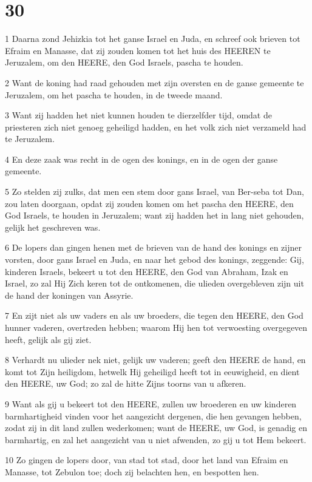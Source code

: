 \chapter{30}

\par 1 Daarna zond Jehizkia tot het ganse Israel en Juda, en schreef ook brieven tot Efraim en Manasse, dat zij zouden komen tot het huis des HEEREN te Jeruzalem, om den HEERE, den God Israels, pascha te houden.
\par 2 Want de koning had raad gehouden met zijn oversten en de ganse gemeente te Jeruzalem, om het pascha te houden, in de tweede maand.
\par 3 Want zij hadden het niet kunnen houden te dierzelfder tijd, omdat de priesteren zich niet genoeg geheiligd hadden, en het volk zich niet verzameld had te Jeruzalem.
\par 4 En deze zaak was recht in de ogen des konings, en in de ogen der ganse gemeente.
\par 5 Zo stelden zij zulks, dat men een stem door gans Israel, van Ber-seba tot Dan, zou laten doorgaan, opdat zij zouden komen om het pascha den HEERE, den God Israels, te houden in Jeruzalem; want zij hadden het in lang niet gehouden, gelijk het geschreven was.
\par 6 De lopers dan gingen henen met de brieven van de hand des konings en zijner vorsten, door gans Israel en Juda, en naar het gebod des konings, zeggende: Gij, kinderen Israels, bekeert u tot den HEERE, den God van Abraham, Izak en Israel, zo zal Hij Zich keren tot de ontkomenen, die ulieden overgebleven zijn uit de hand der koningen van Assyrie.
\par 7 En zijt niet als uw vaders en als uw broeders, die tegen den HEERE, den God hunner vaderen, overtreden hebben; waarom Hij hen tot verwoesting overgegeven heeft, gelijk als gij ziet.
\par 8 Verhardt nu ulieder nek niet, gelijk uw vaderen; geeft den HEERE de hand, en komt tot Zijn heiligdom, hetwelk Hij geheiligd heeft tot in eeuwigheid, en dient den HEERE, uw God; zo zal de hitte Zijns toorns van u afkeren.
\par 9 Want als gij u bekeert tot den HEERE, zullen uw broederen en uw kinderen barmhartigheid vinden voor het aangezicht dergenen, die hen gevangen hebben, zodat zij in dit land zullen wederkomen; want de HEERE, uw God, is genadig en barmhartig, en zal het aangezicht van u niet afwenden, zo gij u tot Hem bekeert.
\par 10 Zo gingen de lopers door, van stad tot stad, door het land van Efraim en Manasse, tot Zebulon toe; doch zij belachten hen, en bespotten hen.
